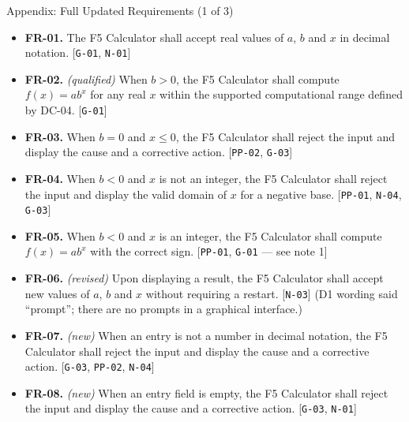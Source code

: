 \documentclass[11pt]{beamer}
\begin{document}
\begin{frame}{Appendix: Full Updated Requirements (1 of 3)}
  \scriptsize
  \begin{itemize}
    \item \textbf{FR-01.} The F5 Calculator shall accept real values of $a$,
          $b$ and $x$ in decimal notation.
          [\texttt{G-01}, \texttt{N-01}]
    \item \textbf{FR-02.} \emph{(qualified)} When $b > 0$, the F5 Calculator
          shall compute $f(x) = ab^{x}$ for any real $x$ within the supported
          computational range defined by DC-04. [\texttt{G-01}]
    \item \textbf{FR-03.} When $b = 0$ and $x \le 0$, the F5 Calculator shall
          reject the input and display the cause and a corrective action.
          [\texttt{PP-02}, \texttt{G-03}]
    \item \textbf{FR-04.} When $b < 0$ and $x$ is not an integer, the F5
          Calculator shall reject the input and display the valid domain of
          $x$ for a negative base.
          [\texttt{PP-01}, \texttt{N-04}, \texttt{G-03}]
    \item \textbf{FR-05.} When $b < 0$ and $x$ is an integer, the F5
          Calculator shall compute $f(x) = ab^{x}$ with the correct sign.
          [\texttt{PP-01}, \texttt{G-01} --- see note 1]
    \item \textbf{FR-06.} \emph{(revised)} Upon displaying a result, the F5
          Calculator shall accept new values of $a$, $b$ and $x$ without
          requiring a restart. [\texttt{N-03}]  (D1 wording said ``prompt'';
          there are no prompts in a graphical interface.)
    \item \textbf{FR-07.} \emph{(new)} When an entry is not a number in decimal
          notation, the F5 Calculator shall reject the input and display the
          cause and a corrective action.
          [\texttt{G-03}, \texttt{PP-02}, \texttt{N-04}]
    \item \textbf{FR-08.} \emph{(new)} When an entry field is empty, the F5
          Calculator shall reject the input and display the cause and a
          corrective action. [\texttt{G-03}, \texttt{N-01}]
  \end{itemize}
\end{frame}
\end{document}
